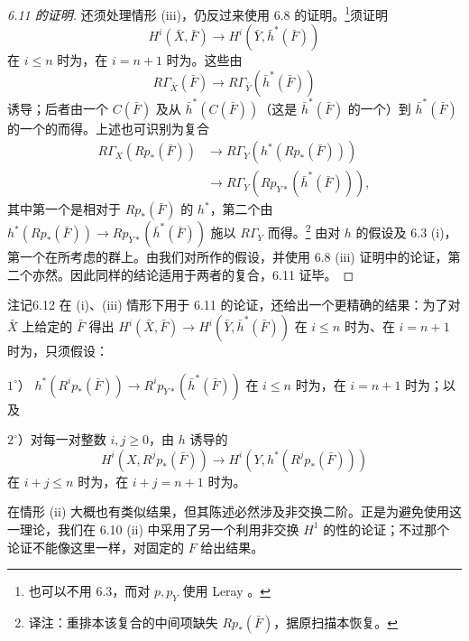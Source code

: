 \begin{proof}[6.11 的证明]
还须处理情形 (iii)，仍反过来使用 6.8 的证明。\footnote{也可以不用 6.3，而对 $p,p_Y$ 使用 Leray 。}须证明
\[
H^i(\bar X,\bar F)\longrightarrow H^i(\bar Y,\bar h^*(\bar F))
\]
在 $i\leq n$ 时为，在 $i=n+1$ 时为。这些由
\[
R\Gamma_{\bar X}(\bar F)\longrightarrow R\Gamma_{\bar Y}(\bar h^*(\bar F))
\]
诱导；后者由一个 $C(\bar F)$ 及从 $\bar h^*(C(\bar F))$（这是 $\bar h^*(\bar F)$ 的一个）到 $\bar h^*(\bar F)$ 的一个的而得。上述也可识别为复合
\[
\begin{aligned}
R\Gamma_X(Rp_*(\bar F))&\longrightarrow R\Gamma_Y(h^*(Rp_*(\bar F)))\\
&\longrightarrow R\Gamma_Y(Rp_{Y*}(\bar h^*(\bar F))),
\end{aligned}
\]
其中第一个是相对于 $Rp_*(\bar F)$ 的 $h^*$，第二个由 $h^*(Rp_*(\bar F))\to Rp_{Y*}(\bar h^*(\bar F))$ 施以 $R\Gamma_Y$ 而得。\footnote{译注：重排本该复合的中间项缺失 $Rp_*(\bar F)$，据原扫描本恢复。}
由对 $h$ 的假设及 6.3 (i)，第一个在所考虑的群上。由我们对所作的假设，并使用 6.8 (iii) 证明中的论证，第二个亦然。因此同样的结论适用于两者的复合，6.11 证毕。
\end{proof}

\begin{SGAresult}{注记}{6.12}
在 (i)、(iii) 情形下用于 6.11 的论证，还给出一个更精确的结果：为了对 $\bar X$ 上给定的 $\bar F$ 得出 $H^i(\bar X,\bar F)\to H^i(\bar Y,\bar h^*(\bar F))$ 在 $i\leq n$ 时为、在 $i=n+1$ 时为，只须假设：

 $1^\circ$）
$h^*(R^ip_*(\bar F))\to R^ip_{Y*}(\bar h^*(\bar F))$
在 $i\leq n$ 时为，在 $i=n+1$ 时为；以及

 $2^\circ$）对每一对整数 $i,j\geq0$，由 $h$ 诱导的
\[
H^i(X,R^jp_*(\bar F))\longrightarrow H^i(Y,h^*(R^jp_*(\bar F)))
\]
在 $i+j\leq n$ 时为，在 $i+j=n+1$ 时为。

在情形 (ii) 大概也有类似结果，但其陈述必然涉及非交换二阶。正是为避免使用这一理论，我们在 6.10 (ii) 中采用了另一个利用非交换 $H^1$ 的性的论证；不过那个论证不能像这里一样，对固定的 $F$ 给出结果。
\end{SGAresult}

